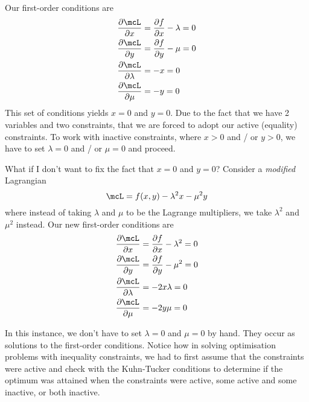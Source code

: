 \documentclass[a4paper, 12pt,oneside,openany]{book}
\begin{document}
Our first-order conditions are \begin{align*} \frac{\partial \mcL}{\partial x} &= \frac{\partial f}{\partial x} - \lambda =0 \\ \frac{\partial \mcL}{\partial y} &= \frac{\partial f}{\partial y} - \mu = 0  \\ \frac{\partial \mcL}{\partial \lambda} &= -x=0 \\ \frac{\partial \mcL}{\partial \mu} &= -y=0\end{align*}
This set of conditions yields $x=0$ and $y=0$. Due to the fact that we have 2 variables and two constraints, that we are forced to adopt our active (equality) constraints. To work with inactive constraints, where $x>0$ and / or $y>0$, we have to set $\lambda=0$ and / or $\mu=0$ and proceed.

What if I don't want to fix the fact that $x=0$ and $y=0$? Consider a \emph{modified} Lagrangian $$\mcL = f(x, y) - \lambda^2x-\mu^2y$$ where instead of taking $\lambda$ and $\mu$ to be the Lagrange multipliers, we take $\lambda^2$ and $\mu^2$ instead. Our new first-order conditions are \begin{align*} \frac{\partial \mcL}{\partial x} &= \frac{\partial f}{\partial x} - \lambda^2 =0 \\ \frac{\partial \mcL}{\partial y} &= \frac{\partial f}{\partial y} - \mu^2 = 0  \\ \frac{\partial \mcL}{\partial \lambda} &= -2x\lambda=0 \\ \frac{\partial \mcL}{\partial \mu} &= -2y\mu=0\end{align*}

In this instance, we don't have to set $\lambda=0$ and $\mu=0$ by hand. They occur as solutions to the first-order conditions. Notice how in solving optimisation problems with inequality constraints, we had to first assume that the constraints were active and check with the Kuhn-Tucker conditions to determine if the optimum was attained when the constraints were active, some active and some inactive, or both inactive. 
\end{document}
